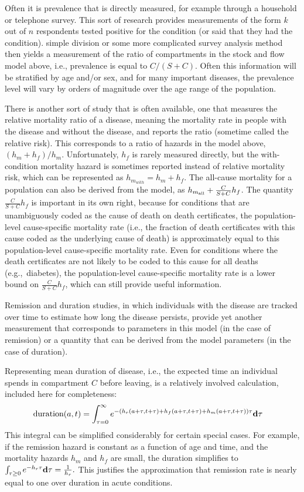 Often it is prevalence that is directly measured, for example through
a household or telephone survey.  This sort of research provides
measurements of the form $k$ out of $n$ respondents tested positive
for the condition (or said that they had the condition). simple
division or some more complicated survey analysis method then yields a
measurement of the ratio of compartments in the stock and flow model
above, i.e., prevalence is equal to $C/(S+C)$.  Often this
information will be stratified by age and/or sex, and for many
important diseases, the prevalence level will vary by orders of
magnitude over the age range of the population.

There is another sort of study that is often available, one that
measures the relative mortality ratio of a disease, meaning the
mortality rate in people with the disease and without the disease, and
reports the ratio (sometime called the relative risk).  This
corresponds to a ratio of hazards in the model above, $(h_m+h_f) /
h_m$.  Unfortunately, $h_f$ is rarely measured directly, but the
with-condition mortality hazard is sometimes reported instead of
relative mortality risk, which can be represented as $h_{m_{with}} =
h_m+h_f$.  The all-cause mortality for a population can also be
derived from the model, as $h_{m_{\text{all}}} + \frac{C}{S+C}h_f$.  The quantity
$\frac{C}{S+C}h_f$ is important in its own right, because for
conditions that are unambiguously coded as the cause of death on death
certificates, the population-level cause-specific mortality rate
(i.e., the fraction of death certificates with this cause coded as the
underlying cause of death) is approximately equal to this
population-level cause-specific mortality rate.  Even for conditions
where the death certificates are not likely to be coded to this cause
for all deaths (e.g.,~diabetes), the population-level cause-specific
mortality rate is a lower bound on $\frac{C}{S+C}h_f$, which can still
provide useful information.

Remission and duration studies, in which individuals with the disease are
tracked over time to estimate how long the disease persists, provide
yet another measurement that corresponds to parameters in this model
(in the case of remission) or a quantity that can be derived from the
model parameters (in the case of duration).

Representing mean duration of disease, i.e., the expected time an
individual spends in compartment $C$ before leaving, is a relatively
involved calculation, included here for completeness:
\begin{align*}
\text{duration}(a, t) &
= \int_{\tau = 0}^\infty e^{-\left(h_r(a+\tau, t+\tau) + h_f(a+\tau, t+\tau) + h_m(a+\tau, t+\tau)\right) \tau}\mathbf{d} \tau
\end{align*}
This integral can be simplified considerably for certain special
cases.  For example, if the remission hazard is constant as a function
of age and time, and the mortality hazards $h_m$ and $h_f$ are small, the duration
simplifies to $\int_{\tau \geq 0} e^{-h_r\tau}\mathbf{d} \tau =
\frac{1}{h_r}.$ This justifies the approximation that remission rate is
nearly equal to one over duration in acute conditions.

